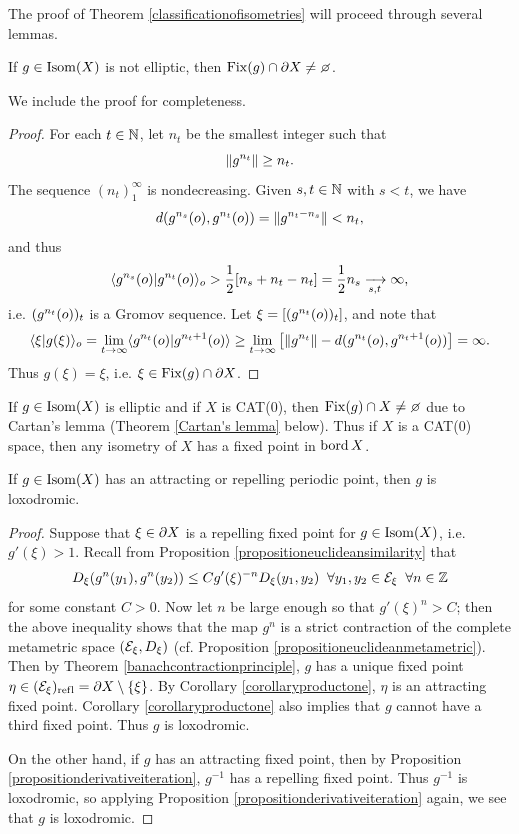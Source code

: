 The proof of Theorem \ref{classificationofisometries} will proceed through several lemmas.

\begin{lemma}
\label{lemmakarlsson}
If $g\in\operatorname{Isom}(X)$ is not elliptic, then $\Fix(g)\cap\del X\neq\emptyset$.
\end{lemma}
We include the proof for completeness.

\begin{proof}
For each $t\in\N$, let $n_t$ be the smallest integer such that
\[
\|g^{n_t}\| \geq n_t.
\]
The sequence $(n_t)_1^\infty$ is nondecreasing. Given $s,t\in\N$ with $s < t$, we have
\[
d(g^{n_s}(o) , g^{n_t}(o)) = \|g^{n_t - n_s}\| < n_t,
\]
and thus
\[
\langle g^{n_s}(o) | g^{n_t}(o)\rangle_o > \frac12 [ n_s + n_t - n_t] = \frac12 n_s \xrightarrow[s,t]{} \infty,
\]
i.e. $(g^{n_t}(o))_t$ is a Gromov sequence. Let $\xi = [(g^{n_t}(o))_t]$, and note that
\[
\langle \xi|g(\xi)\rangle_o = \lim_{t\to\infty} \langle g^{n_t}(o) | g^{n_t + 1}(o) \rangle \geq \lim_{t\to\infty} \left[\|g^{n_t}\| - d(g^{n_t}(o), g^{n_t + 1}(o))\right] = \infty.
\]
Thus $g(\xi) = \xi$, i.e. $\xi\in\operatorname{Fix}(g)\cap\partial X$.
\end{proof}

\begin{remark}
If $g\in\operatorname{Isom}(X)$ is elliptic and if $X$ is CAT(0), then $\Fix(g)\cap X\neq\emptyset$ due to Cartan's lemma (Theorem \ref{Cartan's lemma} below). Thus if $X$ is a CAT(0) space, then any isometry of $X$ has a fixed point in $\operatorname{bord} X$.
\end{remark}

\begin{lemma}
\label{lemmarepellingloxodromic}
If $g\in\operatorname{Isom}(X)$ has an attracting or repelling periodic point, then $g$ is loxodromic.
\end{lemma}
\begin{proof}
Suppose that $\xi\in\partial X$ is a repelling fixed point for $g\in\operatorname{Isom}(X)$, i.e. $g'(\xi) > 1$. Recall from Proposition \ref{propositioneuclideansimilarity} that
\[
\Dist_\xi(g^n(y_1), g^n(y_2)) \leq C g'(\xi)^{-n} \Dist_\xi(y_1, y_2) \all y_1,y_2\in\EE_\xi\all n\in\Z
\]
for some constant $C > 0$. Now let $n$ be large enough so that $g'(\xi)^n > C$; then the above inequality shows that the map $g^n$ is a strict contraction of the complete metametric space $(\mathcal E_\xi,D_\xi)$ (cf. Proposition \ref{propositioneuclideanmetametric}). Then by Theorem \ref{banachcontractionprinciple}, $g$ has a unique fixed point $\eta\in(\mathcal E_\xi)_{\mathrm{ref \hspace{0 in} l}} = \partial X\setminus\{\xi\}$. By Corollary \ref{corollaryproductone}, $\eta$ is an attracting fixed point. Corollary \ref{corollaryproductone} also implies that $g$ cannot have a third fixed point. Thus $g$ is loxodromic.

On the other hand, if $g$ has an attracting fixed point, then by Proposition \ref{propositionderivativeiteration}, $g^{-1}$ has a repelling fixed point. Thus $g^{-1}$ is loxodromic, so applying Proposition \ref{propositionderivativeiteration} again, we see that $g$ is loxodromic.
\end{proof}

